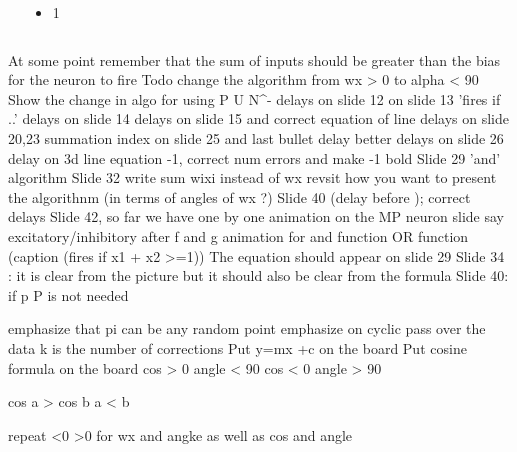 \documentclass[serif, aspectratio=169]{beamer}
\begin{document}
	\begin{frame}
		\begin{columns}

			\begin{overlayarea}{\textwidth}{\textheight}
			\end{overlayarea}

			\begin{overlayarea}{\textwidth}{\textheight}
				\begin{itemize}\justifying
					\item 1
				\end{itemize}
			\end{overlayarea}
		\end{columns}
	\end{frame}
	At some point remember that the sum of inputs should be greater than the bias for the neuron to fire
	Todo change the algorithm from wx > 0 to alpha < 90
	Show the change in algo for using P U N^-
	delays on slide 12
	on slide 13 'fires if ..'
	delays on slide 14
	delays on slide 15 and correct equation of line
	delays on slide 20,23
	summation index on slide 25 and last bullet delay
	better delays on slide 26
	delay on 3d line equation -1, correct num errors and make -1 bold
	Slide 29 'and' algorithm
	Slide 32 write sum wixi instead of wx
	revsit how you want to present the algorithnm (in terms of angles of wx ?)
	Slide 40 (delay before \because); correct delays
	Slide 42, so far we have
	one by one animation on the MP neuron slide
	say excitatory/inhibitory after f and g
	animation for and function
	OR function (caption (fires if x1 + x2 >=1))
	The equation should appear on slide 29
	Slide 34 : it is clear from the picture but it should also be clear from the formula
	Slide 40: if p \in P is not needed

	emphasize that pi can be any random point
	emphasize on cyclic pass over the data
	k is the number of corrections
	Put y=mx +c on the board
	Put cosine formula on the board
	cos > 0 angle < 90
	cos < 0 angle > 90

	cos a > cos b
	a < b

	repeat <0 >0 for wx and angke as well as cos and angle
\fi
\end{document}
